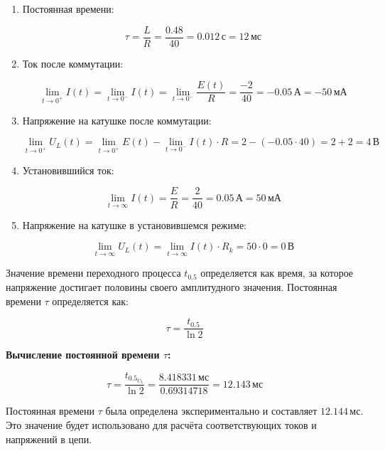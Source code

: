 \begin{enumerate}
	\item Постоянная времени:

	      \[
		      \tau = \frac{L}{R} = \frac{0.48}{40} = 0.012 \, \text{с} = 12 \, \text{мс}
	      \]

	\item Ток после коммутации:

	      \[
		      \lim_{t \to 0^+} I(t) = \lim_{t \to 0^-} I(t) = \lim_{t \to 0^-} \frac{E(t)}{R} = \frac{-2}{40} = -0.05 \, \text{А} = -50 \, \text{мА}
	      \]

	\item Напряжение на катушке после коммутации:

	      \[
		      \lim_{t \to 0^+} U_L(t) = \lim_{t \to 0^+} E(t) - \lim_{t \to 0^-} I(t) \cdot R = 2 - (-0.05 \cdot 40) = 2 + 2 = 4 \, \text{В}
	      \]

	\item Установившийся ток:

	      \[
		      \lim_{t \to \infty} I(t) = \frac{E}{R} = \frac{2}{40} = 0.05 \, \text{А} = 50 \, \text{мА}
	      \]

	\item Напряжение на катушке в установившемся режиме:

	      \[
		      \lim_{t \to \infty} U_L(t) = \lim_{t \to \infty} I(t) \cdot R_k = 50 \cdot 0 = 0 \, \text{В}
	      \]
\end{enumerate}

Значение времени переходного процесса \( t_{0.5} \) определяется как время, за которое напряжение достигает половины своего амплитудного значения. Постоянная времени \( \tau \) определяется как:

\[
	\tau = \frac{t_{0.5}}{\ln 2}
\]

\textbf{Вычисление постоянной времени \( \tau \):}

\[
	\tau = \frac{t_{0.5_{U_L}}}{\ln 2} = \frac{8.418331 \, \text{мс}}{0.69314718} = 12.143 \, \text{мс}
\]

Постоянная времени \( \tau \) была определена экспериментально и составляет
\( 12.144 \, \text{мс} \). Это значение будет использовано для расчёта соответствующих токов и напряжений в цепи.
